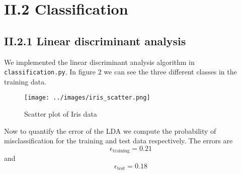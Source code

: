 \documentclass[a4paper,10pt]{article}
\begin{document}
\section*{II.2 Classification}

\subsection*{II.2.1 Linear discriminant analysis}

We implemented the linear discriminant analysis algorithm in \verb=classification.py=. In figure $2$ we can see the three different classes in the training data.
\begin{figure}[H]
	\centering
  		\centering
  		\texttt{[image: ../images/iris\_scatter.png]}
  		\caption{Scatter plot of Iris data}
\end{figure}
Now to quantify the error of the LDA we compute the probability of misclassification for the training and test data respectively. The errors are
$$\epsilon_{\text{training}} = 0.21$$
and
$$\epsilon_{\text{test}} = 0.18$$

\begin{comment}
\begin{figure}[H]
	\centering
	\begin{subfigure}{0.45\textwidth}
  		\centering
  		\texttt{[image: ../week4/images/prob41asurf.png]}
  		\caption{$x=(0,-1)$}
  \end{subfigure}
  \begin{subfigure}{0.45\textwidth}
  		\centering
  		\texttt{[image: ../week4/images/prob41bsurf.png]}
  		\caption{$x=(0,0.05)$}
  \end{subfigure}
  	\caption{Surface plots of $m(p)$ at different points}
\end{figure}
\end{comment}
\end{document}

